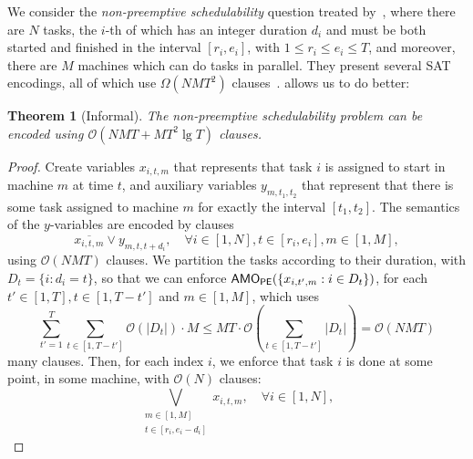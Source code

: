 \documentclass[11pt]{article}
\newtheorem{theorem}{Theorem}
\renewcommand{\O}{\mathcal{O}}
\begin{document}
We consider the \emph{non-preemptive schedulability} question treated by~\citet{mayankEfficientSATEncoding2020}, where there are $N$ tasks, the $i$-th of which has an integer duration $d_i$ and must be both started and finished in the interval $[r_i, e_i]$, with $1 \leq r_i \leq e_i \leq T$, and moreover, there are $M$ machines which can do tasks in parallel. They present several SAT encodings, all of which use $\Omega(N\!MT^2)$ clauses~\citep[Table 2]{mayankEfficientSATEncoding2020}.  allows us to do better:
\begin{theorem}[Informal]\label{thm:non_preemptive_scheduling}
    The non-preemptive schedulability problem can be encoded using $\O(N\!MT + M T^2 \lg T)$ clauses.
\end{theorem}
\begin{proof}
Create variables $x_{i, t, m}$ that represents that task $i$ is assigned to start in machine $m$ at time $t$, and auxiliary variables $y_{m, t_1, t_2}$ that represent that there is some task assigned to machine $m$ for exactly the interval $[t_1, t_2]$.
The semantics of the $y$-variables are encoded by clauses 
\[
    \overline{x_{i, t, m}} \lor y_{m, t, t + d_i}, \quad \forall i \in [1, N], t \in [r_i, e_i], m \in [1, M],
\]
using $\O(N\!MT)$ clauses. We partition the tasks according to their duration, with $D_t = \{ i : d_i = t\}$, so that we can enforce 
$\textsf{AMO}_{\textsf{PE}}(\{x_{i, t', m} : i \in D_t\})$, for each $t' \in [1, T], t \in [1, T - t']$ and $m \in [1, M]$, which uses 
\[
    \sum_{t' = 1}^T \sum_{t \in [1, T - t']} \O(|D_t|) \cdot M \leq M T \cdot \O\left(\sum_{t \in [1, T - t']} |D_t| \right) = \O(N\!M T)
\]
many clauses. 
Then, for each index $i$, we enforce that task $i$ is done at some point, in some machine, with $\O(N)$ clauses: 
\[
\bigvee_{\substack{m \in [1, M]\\
    t \in [r_i, e_i-d_i]}} x_{i, t, m}, \quad \forall i \in [1, N],
\]

\end{proof}
\end{document}

